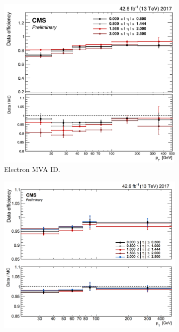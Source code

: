 \begin{figure}[h]
    \centering
    \begin{subfigure}{0.45\textwidth}
        \includegraphics[width=1.0\textwidth]{figures/ch-8-scale-factors-and-corrections/electron_MVA_90wp_identification_efficiency}
        \caption{Electron MVA ID.}
        \label{fig:electron_MVA_ID_efficiency}
    \end{subfigure}
    \hfill
    \begin{subfigure}{0.45\textwidth}
        \includegraphics[width=1.0\textwidth]{figures/ch-8-scale-factors-and-corrections/electron_gsf_tracking_efficiency}

\end{subfigure}
\end{figure}
